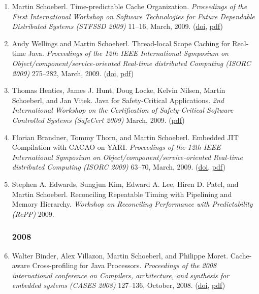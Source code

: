 \begin{enumerate}
\item Martin Schoeberl.
 Time-predictable Cache Organization.
 \emph{Proceedings of the First International Workshop on Software Technologies for Future Dependable Distributed Systems (STFSSD 2009)} 11--16, March, 2009.
(\href{http://dx.doi.org/10.1109/STFSSD.2009.10}{doi}, \href{http://www.jopdesign.com/doc/tpcache.pdf}{pdf})

\item Andy Wellings and Martin Schoeberl.
 Thread-local Scope Caching for Real-time Java.
 \emph{Proceedings of the 12th IEEE International Symposium on Object/component/service-oriented Real-time distributed Computing (ISORC 2009)} 275--282, March, 2009.
(\href{http://dx.doi.org/10.1109/ISORC.2009.13}{doi}, \href{http://www.jopdesign.com/doc/local_scopes.pdf}{pdf})

\item Thomas Henties, James J. Hunt, Doug Locke, Kelvin Nilsen, Martin Schoeberl, and Jan Vitek.
 Java for Safety-Critical Applications.
 \emph{2nd International Workshop on the Certification of Safety-Critical Software Controlled Systems (SafeCert 2009)} March, 2009.
(\href{http://www.jopdesign.com/doc/safecert2009.pdf}{pdf})

\item Florian Brandner, Tommy Thorn, and Martin Schoeberl.
 Embedded JIT Compilation with CACAO on YARI.
 \emph{Proceedings of the 12th IEEE International Symposium on Object/component/service-oriented Real-time distributed Computing (ISORC 2009)} 63--70, March, 2009.
(\href{http://dx.doi.org/10.1109/ISORC.2009.20}{doi}, \href{http://www.jopdesign.com/doc/embcacao.pdf}{pdf})

\item Stephen A. Edwards, Sungjun Kim, Edward A. Lee, Hiren D. Patel, and Martin Schoeberl.
 Reconciling Repeatable Timing with Pipelining and Memory Hierarchy.
 \emph{Workshop on Reconciling Performance with Predictability (RePP)} 2009.



\subsubsection*{2008}

\item Walter Binder, Alex Villazon, Martin Schoeberl, and Philippe Moret.
 Cache-aware Cross-profiling for Java Processors.
 \emph{Proceedings of the 2008 international conference on Compilers, architecture, and synthesis for embedded systems (CASES 2008)} 127--136, October, 2008.
(\href{http://dx.doi.org/10.1145/1450095.1450116}{doi}, \href{http://www.jopdesign.com/doc/crossprofiling_cases2008.pdf}{pdf})


\end{enumerate}

